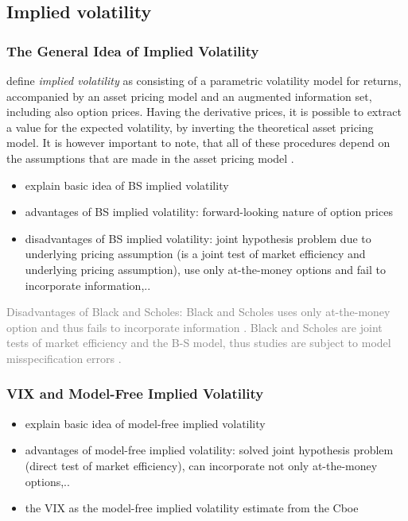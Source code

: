\subsection{Implied volatility}
\subsubsection{The General Idea of Implied Volatility}
\citeauthor{andersen2001} define \emph{implied volatility} as consisting of a parametric volatility model for returns, accompanied by an asset pricing model and an augmented information set, including also option prices. Having the derivative prices, it is possible to extract a value for the expected volatility, by inverting the theoretical asset pricing model. It is however important to note, that all of these procedures depend on the assumptions that are made in the asset pricing model \parencite{andersen2001}. 


\begin{itemize}\itemsep0pt
\item explain basic idea of BS implied volatility
\item advantages of BS implied volatility: forward-looking nature of option prices
\item disadvantages of BS implied volatility: joint hypothesis problem due to underlying  pricing assumption (is a joint test of market efficiency and underlying pricing assumption), use only at-the-money options and fail to incorporate information,..
\end{itemize}

\textcolor{gray}{
Disadvantages of Black and Scholes: Black and Scholes uses only at-the-money option and thus fails to incorporate information \parencite{jiang2003}.
Black and Scholes are joint tests of market efficiency and the B-S model, thus studies are subject to model misspecification errors \parencite{jiang2003}.}

\subsubsection{VIX and Model-Free Implied Volatility}
\begin{itemize}\itemsep0pt
\item explain basic idea of model-free implied volatility
\item advantages of model-free implied volatility: solved joint hypothesis problem (direct test of market efficiency), can incorporate not only at-the-money options,..
\item the VIX as the model-free implied volatility estimate from the Cboe 
\end{itemize}


